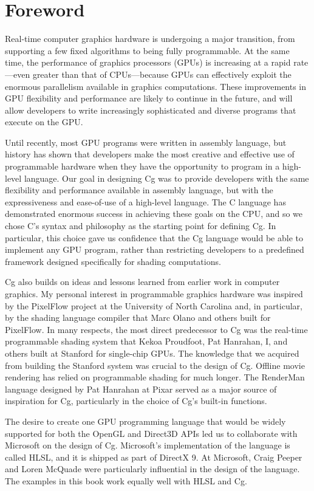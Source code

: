\documentclass[../main.tex]{subfiles}
\begin{document}
\chapter*{Foreword}

Real-time computer graphics hardware is undergoing a major transition, from supporting a few fixed algorithms to being fully programmable. At the same time, the performance of graphics processors (GPUs) is increasing at a rapid rate—even greater than that of CPUs—because GPUs can effectively exploit the enormous parallelism available in graphics computations. These improvements in GPU flexibility and performance are likely to continue in the future, and will allow developers to write increasingly sophisticated and diverse programs that execute on the GPU.

Until recently, most GPU programs were written in assembly language, but history has shown that developers make the most creative and effective use of programmable hardware when they have the opportunity to program in a high-level language. Our goal in designing Cg was to provide developers with the same flexibility and performance available in assembly language, but with the expressiveness and ease-of-use of a high-level language. The C language has demonstrated enormous success in achieving these goals on the CPU, and so we chose C's syntax and philosophy as the starting point for defining Cg. In particular, this choice gave us confidence that the Cg language would be able to implement any GPU program, rather than restricting developers to a predefined framework designed specifically for shading computations.

Cg also builds on ideas and lessons learned from earlier work in computer graphics. My personal interest in programmable graphics hardware was inspired by the PixelFlow project at the University of North Carolina and, in particular, by the shading language compiler that Marc Olano and others built for PixelFlow. In many respects, the most direct predecessor to Cg was the real-time programmable shading system that Kekoa Proudfoot, Pat Hanrahan, I, and others built at Stanford for single-chip GPUs. The knowledge that we acquired from building the Stanford system was crucial to the design of Cg. Offline movie rendering has relied on programmable shading for much longer. The RenderMan language designed by Pat Hanrahan at Pixar served as a major source of inspiration for Cg, particularly in the choice of Cg's built-in functions.

The desire to create one GPU programming language that would be widely supported for both the OpenGL and Direct3D APIs led us to collaborate with Microsoft on the design of Cg. Microsoft's implementation of the language is called HLSL, and it is shipped as part of DirectX 9. At Microsoft, Craig Peeper and Loren McQuade were particularly influential in the design of the language. The examples in this book work equally well with HLSL and Cg.
\end{document}
